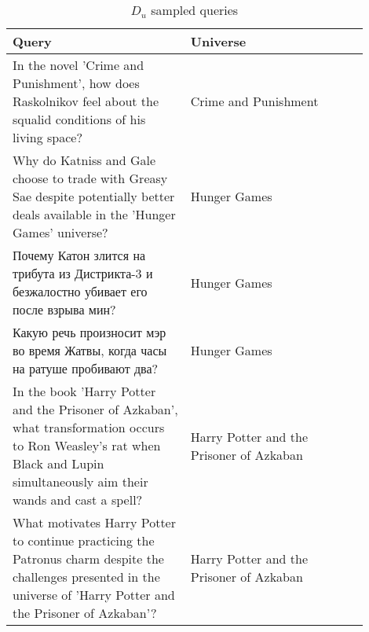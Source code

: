 \begin{table}[ht]
    \centering
    \small
    \caption{$D_u$ sampled queries}
    \label{tab:queries_DU}
    \begin{tabular}{p{0.45\linewidth} p{0.45\linewidth}}
    \toprule
    \textbf{Query} & \textbf{Universe} \\
    \midrule
    In the novel 'Crime and Punishment', how does Raskolnikov feel about the squalid conditions of his living space? & Crime and Punishment \\
    \midrule
    Why do Katniss and Gale choose to trade with Greasy Sae despite potentially better deals available in the 'Hunger Games' universe?      & Hunger Games\\
    \midrule
    Почему Катон злится на трибута из Дистрикта-3 и безжалостно убивает его после взрыва мин? & Hunger Games \\
    \midrule
    Какую речь произносит мэр во время Жатвы, когда часы на ратуше пробивают два?      & Hunger Games \\
    \midrule
    In the book 'Harry Potter and the Prisoner of Azkaban', what transformation occurs to Ron Weasley's rat when Black and Lupin simultaneously aim their wands and cast a spell?          & Harry Potter and the Prisoner of Azkaban \\
    \midrule
    What motivates Harry Potter to continue practicing the Patronus charm despite the challenges presented in the universe of 'Harry Potter and the Prisoner of Azkaban'?          & Harry Potter and the Prisoner of Azkaban \\
    \bottomrule
    \end{tabular}
\end{table}

